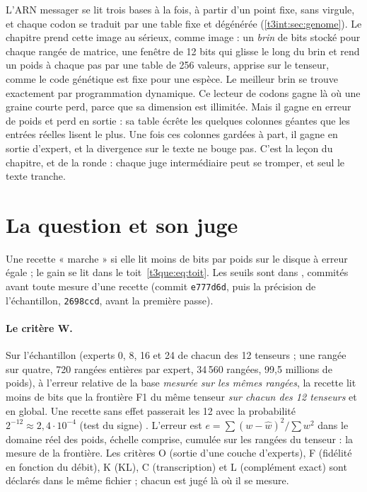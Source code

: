 \begin{enbref}
L'ARN messager se lit trois bases à la fois, à partir d'un point fixe, sans virgule, et chaque codon se traduit par une table fixe et dégénérée (\cref{t3int:sec:genome}). Le chapitre prend cette image au sérieux, comme image : un \emph{brin} de bits stocké pour chaque rangée de matrice, une fenêtre de 12 bits qui glisse le long du brin et rend un poids à chaque pas par une table de 256 valeurs, apprise sur le tenseur, comme le code génétique est fixe pour une espèce. Le meilleur brin se trouve exactement par programmation dynamique. Ce lecteur de codons gagne là où une graine courte perd, parce que sa dimension est illimitée. Mais il gagne en erreur de poids et perd en sortie : sa table écrête les quelques colonnes géantes que les entrées réelles lisent le plus. Une fois ces colonnes gardées à part, il gagne en sortie d'expert, et la divergence sur le texte ne bouge pas. C'est la leçon du chapitre, et de la ronde : chaque juge intermédiaire peut se tromper, et seul le texte tranche.
\end{enbref}

\section{La question et son juge}\label{t3gen:sec:question}

Une recette « marche » si elle lit moins de bits par poids sur le disque à erreur égale ; le gain se lit dans le toit~\eqref{t3que:eq:toit}. Les seuils sont dans , commités avant toute mesure d'une recette (commit \texttt{e777d6d}, puis la précision de l'échantillon, \texttt{2698ccd}, avant la première passe).

\paragraph{Le critère W.} Sur l'échantillon (experts 0, 8, 16 et 24 de chacun des 12 tenseurs ; une rangée sur quatre, 720 rangées entières par expert, 34\,560 rangées, 99,5 millions de poids), à l'erreur relative de la base \emph{mesurée sur les mêmes rangées}, la recette lit moins de bits que la frontière F1 du même tenseur \emph{sur chacun des 12 tenseurs} et en global. Une recette sans effet passerait les 12 avec la probabilité $2^{-12} \approx 2{,}4\cdot10^{-4}$ (test du signe) \calc. L'erreur est $e = \sum (w - \hat w)^2 / \sum w^2$ dans le domaine réel des poids, échelle comprise, cumulée sur les rangées du tenseur : la mesure de la frontière. Les critères O (sortie d'une couche d'experts), F (fidélité en fonction du débit), K (KL), C (transcription) et L (complément exact) sont déclarés dans le même fichier ; chacun est jugé là où il se mesure.

